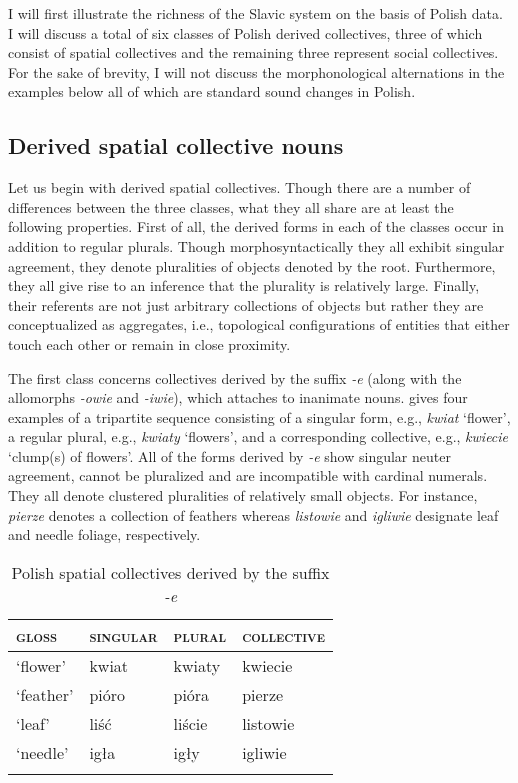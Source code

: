 \documentclass[output=paper]{langscibook}
\begin{document}
I will first illustrate the richness of the Slavic system on the basis of Polish data. I will discuss a total of six classes of Polish derived collectives, three of which consist of spatial collectives and the remaining three represent social collectives. For the sake of brevity, I will not discuss the morphonological alternations in the examples below all of which are standard sound changes in Polish.

\subsection{Derived spatial collective nouns}\label{wan:sec:derived-spatial-collective-nouns}

Let us begin with derived spatial collectives. Though there are a number of differences between the three classes, what they all share are at least the following properties. First of all, the derived forms in each of the classes occur in addition to regular plurals. Though morphosyntactically they all exhibit singular agreement, they denote pluralities of objects denoted by the root. Furthermore, they all give rise to an inference that the plurality is relatively large. Finally, their referents are not just arbitrary collections of objects but rather they are conceptualized as aggregates, i.e., topological configurations of entities that either touch each other or remain in close proximity. 

The first class concerns collectives derived by the suffix \textit{-e} (along with the allomorphs \textit{-owie} and \textit{-iwie}), which attaches to inanimate nouns.  gives four examples of a tripartite sequence consisting of a singular form, e.g., \textit{kwiat} `flower', a regular plural, e.g., \textit{kwiaty} `flowers', and a corresponding collective, e.g., \textit{kwiecie} `clump(s) of flowers'. All of the forms derived by \textit{-e} show singular neuter agreement, cannot be pluralized and are incompatible with cardinal numerals. They all denote clustered pluralities of relatively small objects. For instance, \textit{pierze} denotes a collection of feathers whereas \textit{listowie} and \textit{igliwie} designate leaf and needle foliage, respectively.\largerpage[2]

\begin{table}[h!]
\caption{Polish spatial collectives derived by the suffix \textit{-e}} 
\label{wan:tab:listowie}
 \begin{tabular}{llll} 
  \lsptoprule
           \textsc{gloss} & \textsc{singular} & \textsc{plural} & \textsc{collective} \\ 
  \midrule
  `flower'  &   kwiat &   kwiaty &    kwiecie \\
  `feather'  &   pióro &   pióra &    pierze \\
  `leaf'  &   liść &    liście  &    listowie \\
  `needle'  &   igła &    igły  &    igliwie \\
  \lspbottomrule
 \end{tabular}
\end{table}
\end{document}
